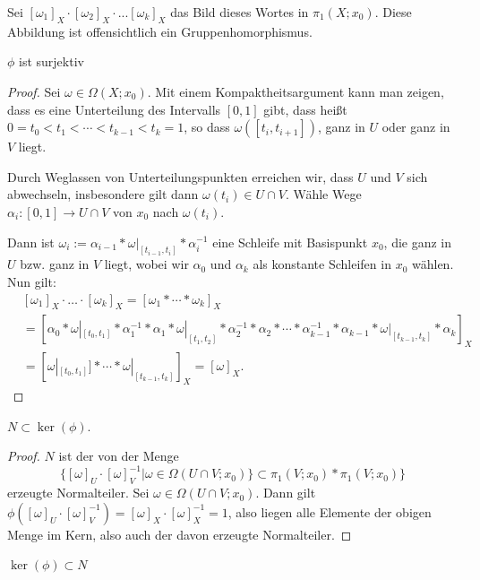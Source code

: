 \documentclass[a4paper,10pt]{scrartcl}
\begin{document}
Sei $[\omega_1]_X\cdot [\omega_2]_X\cdot ... [\omega_k]_X$ das Bild dieses Wortes in $\pi_1(X;x_0)$. Diese Abbildung ist offensichtlich ein Gruppenhomorphismus.
\begin{lem} \label{thm2:5.5}
 $\phi$ ist surjektiv
\end{lem}
\begin{proof}
 Sei $\omega\in \Omega(X;x_0)$. Mit einem Kompaktheitsargument kann man zeigen, dass es eine Unterteilung des Intervalls $[0,1]$ gibt, dass heißt $0=t_0<t_1<\dotsb <t_{k-1}<t_k=1$, so dass $\omega([t_i, t_{i+1}])$, ganz in $U$ oder ganz in $V$ liegt.
\begin{figure}[H]
 \centering
\fixme[fig109]
\caption{}
\end{figure}
Durch Weglassen von Unterteilungspunkten erreichen wir, dass $U$ und $V$ sich abwechseln, insbesondere gilt dann $\omega(t_i)\in U\cap V$. Wähle Wege $\alpha_i:[0,1]\to U\cap V$ von $x_0$ nach $\omega(t_i).$

Dann ist $\omega_i:=\alpha_{i-1} * \omega|_{[t_{i-1}, t_i]}*\alpha_i^{-1}$ eine Schleife mit Basispunkt $x_0$, die ganz in $U$ bzw. ganz in $V$ liegt, wobei wir $\alpha_0$ und $\alpha_k$ als konstante Schleifen in $x_0$ wählen. Nun gilt:
\begin{align*}
 &[\omega_1]_X\cdot \dotso \cdot [\omega_k]_X=[\omega_1* \dotsm *\omega_k]_X\\
&=\left [\alpha_0*\omega|_{[t_0,t_1]}*\alpha_1^{-1}*\alpha_1*\omega|_{[t_1, t_2]}*\alpha_2^{-1}*\alpha_2 * \dotsm *\alpha_{k-1}^{-1}*\alpha_{k-1}*\omega|_{[t_{k-1},t_k]}*\alpha_k \right ]_X\\
&= [\omega|_{[t_0, t_1]}]* \dotsm *\omega|_{[t_{k-1}, t_k]}]_X=[\omega]_X.
\end{align*}
\end{proof}
\begin{lem}
 $N\subset \ker(\phi)$.
\end{lem}
\begin{proof}
 $N$ ist der von der Menge
\[
 \{[\omega]_U\cdot [\omega]_V^{-1}|\omega\in \Omega(U\cap V;x_0)\}\subset \pi_1(V;x_0)*\pi_1(V;x_0)\}
\]
erzeugte Normalteiler. Sei $\omega\in \Omega(U\cap V; x_0)$. Dann gilt $\phi([\omega]_U\cdot [\omega]_V^{-1})=[\omega]_X\cdot [\omega]_X^{-1}=1$, also liegen alle Elemente der obigen Menge im Kern, also auch der davon erzeugte Normalteiler.
\end{proof}
\begin{lem}\label{thm2:5.7}
 $\ker(\phi)\subset N$
\end{lem}
\end{document}
